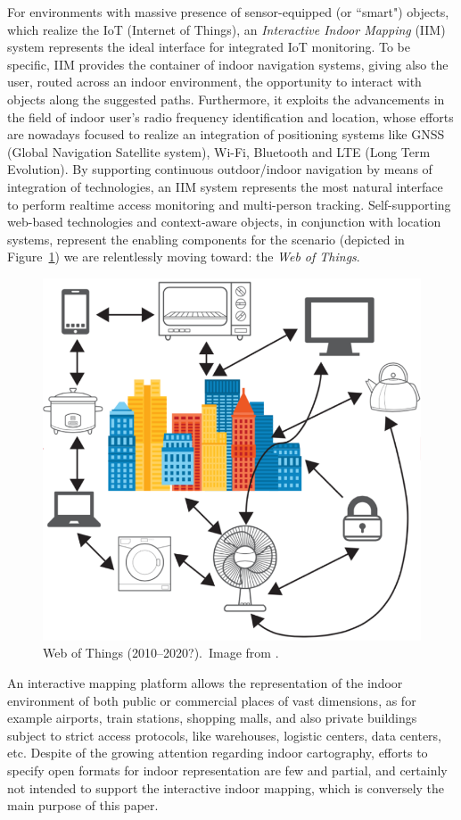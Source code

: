 \documentclass[]{egpubl}
\begin{document}
For environments with massive presence of sensor-equipped (or ``smart")
objects, which realize the IoT (Internet of Things), an \emph{Interactive Indoor
Mapping} (IIM) system represents the ideal interface for integrated IoT monitoring.
To be specific, IIM provides the container of indoor navigation systems, giving also 
the user, routed across an indoor environment, the opportunity to
interact with objects along the suggested paths. Furthermore, it exploits the advancements in the field of indoor user's  radio frequency identification and location, whose efforts are
nowadays focused to realize an integration of positioning systems like GNSS
(Global Navigation Satellite system), Wi-Fi, Bluetooth and LTE (Long Term
Evolution).  By supporting continuous outdoor/indoor navigation by means of
integration of technologies, an IIM system represents the most natural interface to
perform realtime access monitoring and multi-person tracking. Self-supporting web-based
technologies and context-aware objects, in conjunction  with
location systems, represent the enabling components for the scenario (depicted in
Figure~\ref{fig:web-of-thing}) we are relentlessly moving toward: the \emph{Web of
Things}.

\begin{figure}[htbp]
\centering
\includegraphics[width=.5\linewidth]{images/webOfThings.pdf}
\caption{Web of Things (2010--2020?).~Image from \cite{webOfThings:2015}.}
\label{fig:web-of-thing}
\end{figure}


An interactive mapping platform allows the representation of the indoor
environment of  both public or commercial places of vast dimensions, as for
example airports, train stations, shopping malls, and also private buildings
subject to strict access protocols, like warehouses, logistic centers, data
centers, etc. Despite of the growing attention regarding indoor cartography,
efforts to specify open formats for indoor representation are few and partial,
and certainly not intended to support the interactive indoor mapping, which is
conversely the main purpose of this paper.
\end{document}
